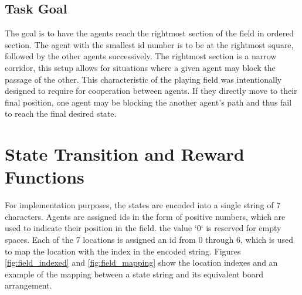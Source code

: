 \documentclass[10pt]{article}
\begin{document}
\subsection{Task Goal}
    The goal is to have the agents reach the rightmost section of the field in ordered section. The agent with the smallest id number is to be at the rightmost square, followed by the other agents successively. The rightmost section is a narrow corridor, this setup allows for situations where a given agent may block the passage of the other. This characteristic of the playing field was intentionally designed to require for cooperation between agents. If they directly move to their final position, one agent may be blocking the another agent's path and thus fail to reach the final desired state.



\section{State Transition and Reward Functions} \label{sec:transition}
    For implementation purposes, the states are encoded into a single string of 7 characters. Agents are assigned ids in the form of positive numbers, which are used to indicate their position in the field. the value `0` is reserved for empty spaces. Each of the 7 locations is assigned an id from 0 through 6, which is used to map the location with the index in the encoded string. Figures \ref{fig:field_indexed} and \ref{fig:field_mapping} show the location indexes and an example of the mapping between a state string and its equivalent board arrangement.
\end{document}
